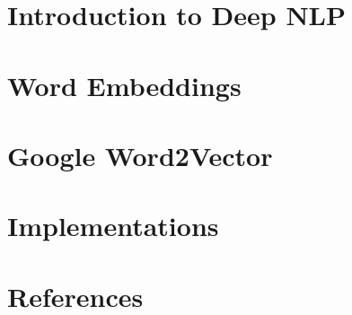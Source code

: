 % 

\section[DNLP]{Introduction to Deep NLP}


\section[Embedding]{Word Embeddings}







\section[W2V]{Google Word2Vector}




\section[Impl]{Implementations}




\section[Refs]{References}


